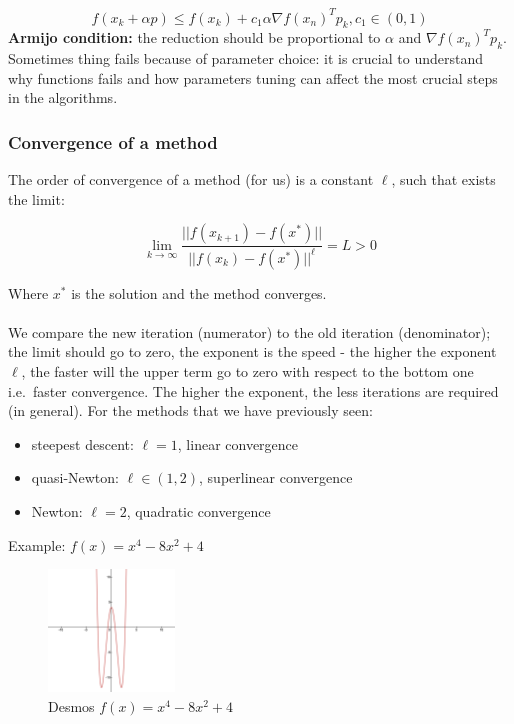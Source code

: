 $$
f(x_k+\alpha p) \leq f(x_k) + c_1\alpha \nabla f(x_n)^T p_k, c_1 \in (0,1)
$$
\noindent
\textbf{Armijo condition:} the reduction should be proportional to
$\alpha$ and $\nabla f(x_n)^T p_k$.
\noindent
Sometimes thing fails because of parameter choice: it is crucial to
understand why functions fails and how parameters tuning can affect the
most crucial steps in the algorithms.


\subsubsection{Convergence of a method}

The order of convergence of a method (for us) is a constant $\ell$, such
that exists the limit:

$$
\lim_{k \rightarrow \infty  }\frac{||f(x_{k+1})-f(x^*)||}{||f(x_{k})-f(x^*)||^\ell} = L >0
$$

Where $x^*$ is the solution and the method converges.
\\
\\
\noindent
We compare the new iteration (numerator) to the old iteration
(denominator); the limit should go to zero, the exponent is the speed -
the higher the exponent $\ell$, the faster will the upper term go to
zero with respect to the bottom one i.e.~faster convergence. The higher
the exponent, the less iterations are required (in general). For the
methods that we have previously seen:

\begin{itemize}
\tightlist
\item
  steepest descent: $\ell=1$, linear convergence
\item
  quasi-Newton: $\ell \in (1,2)$, superlinear convergence
\item
  Newton: $\ell=2$, quadratic convergence
\end{itemize}

Example: $f(x)=x^4-8x^2+4$

\begin{figure}
\centering
\includegraphics[width=0.3\textwidth]{function.png}
\caption{Desmos  $f(x)=x^4-8x^2+4$}
\end{figure}

